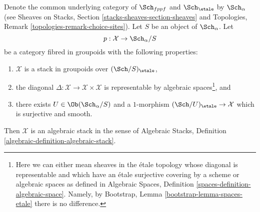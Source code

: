 \begin{lemma}
\label{lemma-stacks-etale}
Denote the common underlying category of $\Sch_{fppf}$
and $\Sch_\etale$ by $\Sch_\alpha$ (see
Sheaves on Stacks, Section \ref{stacks-sheaves-section-sheaves} and
Topologies, Remark \ref{topologies-remark-choice-sites}). Let $S$ be an object
of $\Sch_\alpha$. Let
$$
p : \mathcal{X} \to \Sch_\alpha/S
$$
be a category fibred in groupoids with the following properties:
\begin{enumerate}
\item $\mathcal{X}$ is a stack in groupoids over $(\Sch/S)_\etale$,
\item the diagonal $\Delta : \mathcal{X} \to \mathcal{X} \times \mathcal{X}$
is representable by algebraic spaces\footnote{Here we can either mean
sheaves in the \'etale topology whose diagonal is representable and which
have an \'etale surjective covering by a scheme or algebraic spaces as
defined in
Algebraic Spaces, Definition \ref{spaces-definition-algebraic-space}.
Namely, by Bootstrap, Lemma \ref{bootstrap-lemma-spaces-etale}
there is no difference.}, and
\item there exists $U \in \Ob(\Sch_\alpha/S)$
and a $1$-morphism $(\Sch/U)_\etale \to \mathcal{X}$
which is surjective and smooth.
\end{enumerate}
Then $\mathcal{X}$ is an algebraic stack in the sense of
Algebraic Stacks, Definition \ref{algebraic-definition-algebraic-stack}.
\end{lemma}

